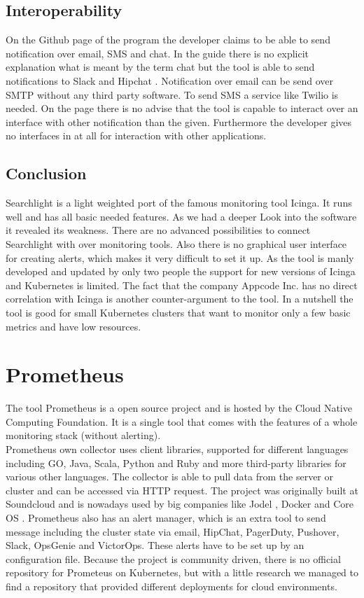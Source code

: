 \subsection{Interoperability}
On the Github page \cite{searchlight} of the program the developer claims to be able to send notification over email, SMS and chat.
In the guide there is no explicit explanation what is meant by the term chat but the tool is able to send notifications to Slack \cite{slack} and Hipchat \cite{hipchat}. Notification over email can be send over SMTP without any third party software. To send SMS a service like Twilio \cite{twilio} is needed.
On the page there is no advise that the tool is capable to interact over an interface with other notification than the given. Furthermore the developer gives no interfaces in at all for interaction with other applications.
\subsection{Conclusion}
Searchlight is a light weighted  port of the famous monitoring tool Icinga. It runs well and has all basic needed features. As we had a deeper Look  into the software  it revealed its weakness. There are no advanced possibilities to connect Searchlight with over monitoring tools. Also there is no graphical user interface for creating alerts, which makes it very difficult to set it up. As the tool is manly developed and updated by only two people the support for new versions of Icinga and Kubernetes is limited. The fact that the company Appcode Inc. has no direct correlation with Icinga is another counter-argument to the tool. In a nutshell the tool is good for small Kubernetes clusters that want to monitor only a few basic metrics and have low resources. 

\section{Prometheus}
\label{Prometheus} %
The tool Prometheus is a open source project and is hosted by the Cloud Native Computing Foundation.
It is a single tool that comes with the features of a whole monitoring stack (without alerting).\\ Prometheus own collector uses client libraries, supported for different languages including GO, Java, Scala, Python and Ruby and more third-party libraries for various other languages. The collector is able to pull data from the server or cluster and can be accessed via HTTP request.
The project was originally built at Soundcloud \cite{soundcloud} and  is nowadays used by big companies like Jodel \cite{jodel}, Docker and Core OS \cite{prometeus}.
Prometheus also has an alert manager, which is an extra tool to send message including the cluster state via email, HipChat, PagerDuty, Pushover, Slack, OpsGenie and VictorOps. These alerts have to be set up by an configuration file. 
Because the project is community driven, there is no official repository for Prometeus on Kubernetes, but with a little research we managed to find a repository \cite{prometheus_kube} that provided different deployments for cloud environments.

